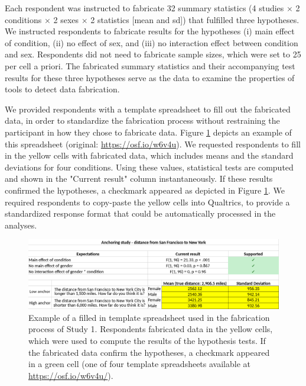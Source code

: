 \documentclass{article}
\begin{document}
Each respondent was instructed to fabricate 32 summary statistics (4 studies $\times$ 2 conditions $\times$ 2 sexes $\times$ 2 statistics [mean and sd]) that fulfilled three hypotheses. We instructed respondents to fabricate results for the hypotheses (i) main effect of condition, (ii) no effect of sex, and (iii) no interaction effect between condition and sex. Respondents did not need to fabricate sample sizes, which were set to 25 per cell a priori. The fabricated summary statistics and their accompanying test results for these three hypotheses serve as the data to examine the properties of tools to detect data fabrication.

We provided respondents with a template spreadsheet to fill out the fabricated data, in order to standardize the fabrication process without restraining the participant in how they chose to fabricate data. Figure \ref{fig1} depicts an example of this spreadsheet (original:  \url{https://osf.io/w6v4u}). We requested respondents to fill in the yellow cells with fabricated data, which includes means and the standard deviations for four conditions. Using these values, statistical tests are computed and shown in the "Current result" column instantaneously. If these results confirmed the hypotheses, a checkmark appeared as depicted in Figure \ref{fig1}. We required respondents to copy-paste the yellow cells into Qualtrics, to provide a standardized response format that could be automatically processed in the analyses.

\begin{figure}
\begin{center}
\includegraphics[width=\textwidth,height=\textheight,keepaspectratio]{../figures/spreadsheet.png}
\caption{Example of a filled in template spreadsheet used in the fabrication process of Study 1. Respondents fabricated data in the yellow cells, which were used to compute the results of the hypothesis tests. If the fabricated data confirm the hypotheses, a checkmark appeared in a green cell (one of four template spreadsheets available at \url{https://osf.io/w6v4u/}).}
\label{fig1}
\end{center}
\end{figure}
\end{document}
